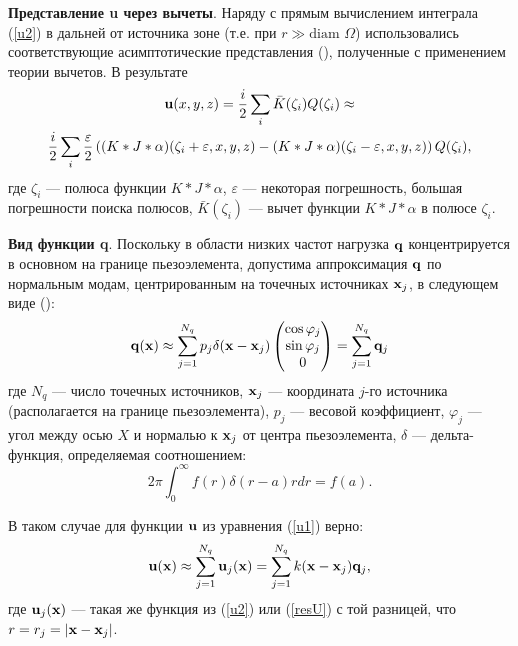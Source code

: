 \documentclass[a4paper, 12pt]{article}
\begin{document}
{\bf Представление u через вычеты}. Наряду с прямым вычислением интеграла (\ref{u2}) в дальней от источника зоне
(т.е. при $r \gg \text{diam } \Omega$) использовались соответствующие асимптотические представления
(\cite{g89}), полученные с применением теории вычетов. В результате
\begin{multline}
    {\bf u}(x,y,z)=\frac{i}{2} \sum_i \bar{K}(\zeta_i) Q(\zeta_i) \approx \\
    \frac{i}{2} \sum_i \frac{\varepsilon}{2} \left( (K*J*\alpha)(\zeta_i+\varepsilon,x,y,z)-(K*J*\alpha)(\zeta_i-\varepsilon,x,y,z) \right)  Q(\zeta_i),
\label{resU}
\end{multline}
где $\zeta_i$ --- полюса функции $K*J*\alpha$, $\varepsilon$ --- некоторая погрешность, большая погрешности поиска полюсов,
$\bar{K}(\zeta_i)$ --- вычет функции $K*J*\alpha$ в полюсе $\zeta_i$.

{\bf Вид функции q}. Поскольку в области низких частот нагрузка ${\bf q}$ концентрируется в основном на границе пьезоэлемента,
допустима аппроксимация ${\bf q}$ по нормальным модам, центрированным на точечных источниках ${\bf x}_j$, в следующем виде (\cite{eng}):
\begin{equation}
    {\bf q}({\bf x}) \approx \sum_{j=1}^{N_q} p_j \delta({\bf x}-{\bf x}_j)
    \begin{pmatrix}
        \cos \varphi_j\\
        \sin \varphi_j\\
        0
    \end{pmatrix}=
    \sum_{j=1}^{N_q} {\bf q}_j
\end{equation}
где $N_q$ --- число точечных источников, ${\bf x}_j$ --- координата $j$-го источника (располагается на границе пьезоэлемента), $p_j$ --- весовой коэффициент,
$\varphi_j$ --- угол между осью $X$ и нормалью к ${\bf x}_j$ от центра пьезоэлемента,
$\delta$ --- дельта-функция, определяемая соотношением:
\begin{equation*}
    2 \pi \int_0^{\infty} f(r) \delta(r-a) r dr =f(a).
\end{equation*}

В таком случае для функции ${\bf u}$ из уравнения (\ref{u1}) верно:
\begin{equation}
    {\bf u}({\bf x}) \approx \sum_{j=1}^{N_q} {\bf u}_j({\bf x})=\sum_{j=1}^{N_q} k({\bf x}-{\bf x}_j) {\bf q}_j,
\end{equation}
где ${\bf u}_j({\bf x})$ --- такая же функция из (\ref{u2}) или (\ref{resU}) с той разницей, что $r=r_j=|{\bf x} -{\bf x}_j|$.
\end{document}
